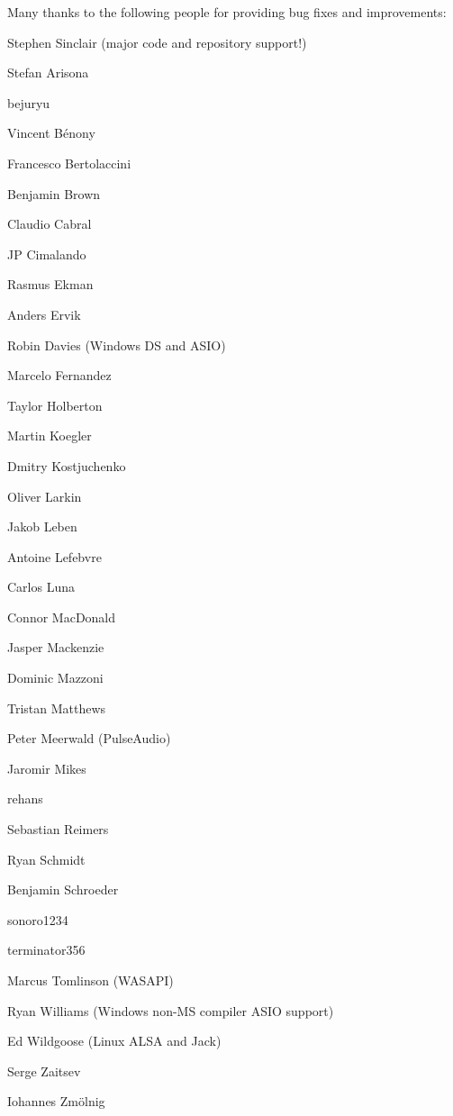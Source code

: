 Many thanks to the following people for providing bug fixes and improvements\+: 
\begin{DoxyItemize}
\item Stephen Sinclair (major code and repository support!) 
\item Stefan Arisona 
\item bejuryu 
\item Vincent B\'{e}nony 
\item Francesco Bertolaccini 
\item Benjamin Brown 
\item Claudio Cabral 
\item JP Cimalando 
\item Rasmus Ekman 
\item Anders Ervik 
\item Robin Davies (Windows DS and A\+S\+IO) 
\item Marcelo Fernandez 
\item Taylor Holberton 
\item Martin Koegler 
\item Dmitry Kostjuchenko 
\item Oliver Larkin 
\item Jakob Leben 
\item Antoine Lefebvre 
\item Carlos Luna 
\item Connor Mac\+Donald 
\item Jasper Mackenzie 
\item Dominic Mazzoni 
\item Tristan Matthews 
\item Peter Meerwald (Pulse\+Audio) 
\item Jaromir Mikes 
\item rehans 
\item Sebastian Reimers 
\item Ryan Schmidt 
\item Benjamin Schroeder 
\item sonoro1234 
\item terminator356 
\item Marcus Tomlinson (W\+A\+S\+A\+PI) 
\item Ryan Williams (Windows non-\/\+MS compiler A\+S\+IO support) 
\item Ed Wildgoose (Linux A\+L\+SA and Jack) 
\item Serge Zaitsev 
\item Iohannes Zm\"{o}lnig


\end{DoxyItemize}

